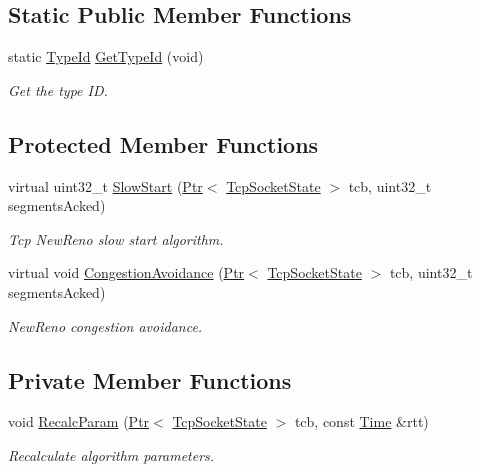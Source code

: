 \subsection*{Static Public Member Functions}
\begin{DoxyCompactItemize}
\item 
static \hyperlink{classns3_1_1TypeId}{Type\+Id} \hyperlink{classns3_1_1TcpHybla_ab0713a818be55782fe433232f5cbc412}{Get\+Type\+Id} (void)
\begin{DoxyCompactList}\small\item\em Get the type ID. \end{DoxyCompactList}\end{DoxyCompactItemize}
\subsection*{Protected Member Functions}
\begin{DoxyCompactItemize}
\item 
virtual uint32\+\_\+t \hyperlink{classns3_1_1TcpHybla_a374c804fcaf21e2cd4c51f0ff6003798}{Slow\+Start} (\hyperlink{classns3_1_1Ptr}{Ptr}$<$ \hyperlink{classns3_1_1TcpSocketState}{Tcp\+Socket\+State} $>$ tcb, uint32\+\_\+t segments\+Acked)
\begin{DoxyCompactList}\small\item\em Tcp New\+Reno slow start algorithm. \end{DoxyCompactList}\item 
virtual void \hyperlink{classns3_1_1TcpHybla_a10463113be84c3506fe85b5abfe8b186}{Congestion\+Avoidance} (\hyperlink{classns3_1_1Ptr}{Ptr}$<$ \hyperlink{classns3_1_1TcpSocketState}{Tcp\+Socket\+State} $>$ tcb, uint32\+\_\+t segments\+Acked)
\begin{DoxyCompactList}\small\item\em New\+Reno congestion avoidance. \end{DoxyCompactList}\end{DoxyCompactItemize}
\subsection*{Private Member Functions}
\begin{DoxyCompactItemize}
\item 
void \hyperlink{classns3_1_1TcpHybla_a95d8b83e64724cd6ee323211a9b2a16f}{Recalc\+Param} (\hyperlink{classns3_1_1Ptr}{Ptr}$<$ \hyperlink{classns3_1_1TcpSocketState}{Tcp\+Socket\+State} $>$ tcb, const \hyperlink{classns3_1_1Time}{Time} \&rtt)
\begin{DoxyCompactList}\small\item\em Recalculate algorithm parameters. \end{DoxyCompactList}\end{DoxyCompactItemize}
